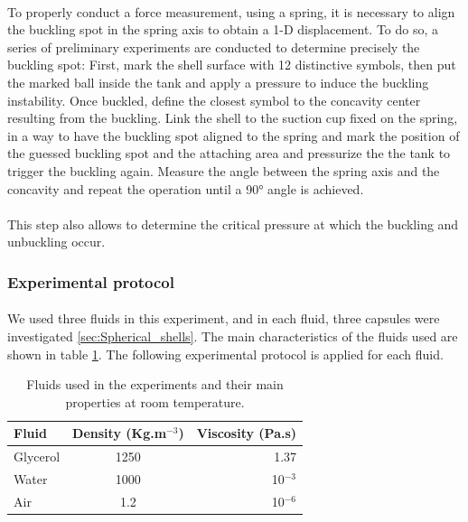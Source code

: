\paragraph{}
To properly conduct a force measurement, using a spring, it is necessary to align the buckling spot in the spring axis to obtain a 1-D displacement. To do so, a series of preliminary experiments are conducted to determine precisely the buckling spot:
First, mark the shell surface with 12 distinctive symbols, then put the marked ball inside the tank and apply a pressure to induce the buckling instability. Once buckled, define the closest symbol to the concavity center resulting from the buckling. Link the shell to the suction cup fixed on the spring, in a way to have the buckling spot aligned to the spring and mark the position of the guessed buckling spot and the attaching area and pressurize the the tank to trigger the buckling again. Measure the angle between the spring axis and the concavity and repeat the operation until a 90° angle is achieved. 
\paragraph{}
This step also allows to determine the critical pressure at which the buckling and unbuckling occur.
\subsubsection{Experimental protocol}
\paragraph{}
We used three fluids in this experiment, and in each fluid, three capsules were investigated \ref{sec:Spherical_shells}.
The main characteristics of the fluids used are shown in table \ref{tab:fluid_carac_spring}. The following experimental protocol is applied for each fluid.
\begin{table}[H]
	\centering
		\begin{tabular}{|l|c|r|}
			\hline
			Fluid & Density (Kg.m$^{-3}$) & Viscosity (Pa.s)\\
			\hline
			Glycerol & 1250 & 1.37 \\
			\hline
			Water & 1000 & 10$^{-3} $\\
			\hline
			Air &  1.2 & 10$^{-6}$\\
			\hline
		\end{tabular}
	
	\caption{Fluids used in the experiments and their main properties at room temperature.}
	\label{tab:fluid_carac_spring}
\end{table}
